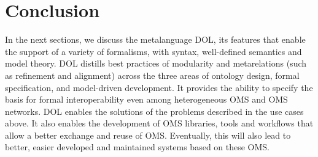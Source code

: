 \documentclass[10pt,fleqn,%
\ifpretendfinal
final%
\else
draft%
\fi,
]{scrreprt}
\begin{document}
\section{Conclusion}

In the next sections, we discuss  the metalanguage DOL, its features that enable the support of a variety of formalisms, with syntax, well-defined semantics and model theory. DOL 
distills best practices of modularity and metarelations (such as refinement and alignment) across the three areas of ontology design, formal 
specification, and model-driven development. It provides the ability to specify the basis for formal interoperability even among heterogeneous OMS and OMS networks. DOL enables the solutions of the problems described in the use cases above. It also enables the development of OMS libraries, tools and workflows that 
allow  a better exchange and reuse of OMS. Eventually, this will also lead to better, easier developed and maintained systems based on these OMS.
\end{document}
